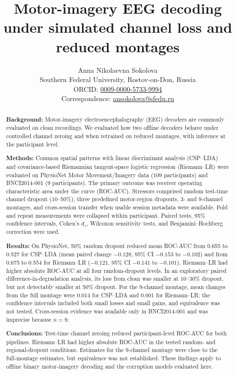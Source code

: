 \documentclass[11pt]{article}
\title{Motor-imagery EEG decoding under simulated channel loss and reduced montages}
\author{Anna Nikolaevna Sokolova\\
\small Southern Federal University, Rostov-on-Don, Russia\\
\small ORCID: \href{https://orcid.org/0009-0000-5733-9994}{0009-0000-5733-9994}\\
\small Correspondence: \href{mailto:ansokolova@sfedu.ru}{ansokolova@sfedu.ru}}
\date{}
\begin{document}
\maketitle
\linenumbers

\begin{abstract}
\textbf{Background:} Motor-imagery electroencephalography (EEG) decoders are commonly evaluated on clean recordings. We evaluated how two offline decoders behave under controlled channel zeroing and when retrained on reduced montages, with inference at the participant level.

\textbf{Methods:} Common spatial patterns with linear discriminant analysis (CSP--LDA) and covariance-based Riemannian tangent-space logistic regression (Riemann--LR) were evaluated on PhysioNet Motor Movement/Imagery data (109 participants) and BNCI2014-001 (9 participants). The primary outcome was receiver operating characteristic area under the curve (ROC-AUC). Stressors comprised random test-time channel dropout (10--50\%), three predefined motor-region dropouts, 3- and 9-channel montages, and cross-session transfer when usable session metadata were available. Fold and repeat measurements were collapsed within participant. Paired tests, 95\% confidence intervals, Cohen's $d_z$, Wilcoxon sensitivity tests, and Benjamini--Hochberg correction were used.

\textbf{Results:} On PhysioNet, 50\% random dropout reduced mean ROC-AUC from 0.655 to 0.527 for CSP--LDA (mean paired change $-0.128$, 95\% CI $-0.153$ to $-0.102$) and from 0.675 to 0.554 for Riemann--LR ($-0.121$, 95\% CI $-0.141$ to $-0.101$). Riemann--LR had higher absolute ROC-AUC at all four random-dropout levels. In an exploratory paired difference-in-degradation analysis, its loss from clean was smaller at 10--30\% dropout, but not detectably smaller at 50\% dropout. For the 9-channel montage, mean changes from the full montage were 0.014 for CSP--LDA and 0.001 for Riemann--LR; the confidence intervals included both small losses and small gains, and equivalence was not tested. Cross-session evidence was available only in BNCI2014-001 and was imprecise because $n=9$.

\textbf{Conclusions:} Test-time channel zeroing reduced participant-level ROC-AUC for both pipelines. Riemann--LR had higher absolute ROC-AUC in the tested random- and regional-dropout conditions. Estimates for the 9-channel montage were close to the full-montage estimates, but equivalence was not established. These findings apply to offline binary motor-imagery decoding and the corruption models evaluated here.
\end{abstract}
\end{document}
